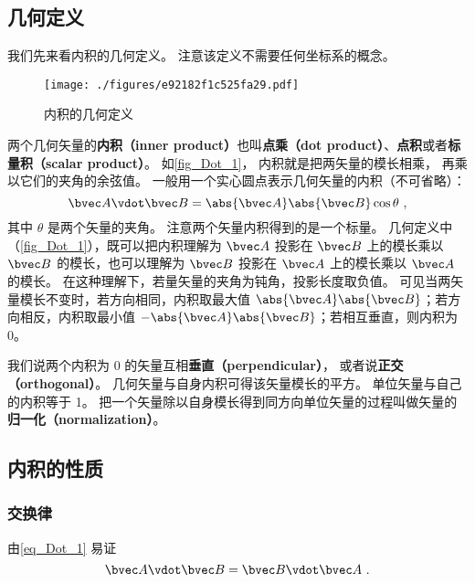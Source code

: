 

\subsection{几何定义}
我们先来看内积的几何定义。 注意该定义不需要任何坐标系的概念。
\begin{figure}[th]
\centering
\texttt{[image: ./figures/e92182f1c525fa29.pdf]}
\caption{内积的几何定义}\label{fig_Dot_1}
\end{figure}

两个几何矢量的\textbf{内积（inner product）}也叫\textbf{点乘（dot product）}、\textbf{点积}或者\textbf{标量积（scalar product）}。 如\autoref{fig_Dot_1}， 内积就是把两矢量的模长相乘， 再乘以它们的夹角的余弦值。 一般用一个实心圆点表示几何矢量的内积（不可省略）：
\begin{equation}\label{eq_Dot_1}
\bvec A \vdot \bvec B = \abs{\bvec A} \abs{\bvec B} \cos\theta ~,
\end{equation}
其中 $\theta$ 是两个矢量的夹角。 注意两个矢量内积得到的是一个标量。 几何定义中（\autoref{fig_Dot_1}），既可以把内积理解为 $\bvec A$ 投影在 $\bvec B$ 上的模长乘以 $\bvec B$ 的模长，也可以理解为 $\bvec B$ 投影在 $\bvec A$ 上的模长乘以 $\bvec A$ 的模长。 在这种理解下，若量矢量的夹角为钝角，投影长度取负值。 可见当两矢量模长不变时，若方向相同，内积取最大值 $\abs{\bvec A}\abs{\bvec B}$；若方向相反，内积取最小值 $-\abs{\bvec A}\abs{\bvec B}$；若相互垂直，则内积为 0。

我们说两个内积为 0 的矢量互相\textbf{垂直（perpendicular）}， 或者说\textbf{正交（orthogonal）}。 几何矢量与自身内积可得该矢量模长的平方。 单位矢量与自己的内积等于 1。 把一个矢量除以自身模长得到同方向单位矢量的过程叫做矢量的\textbf{归一化（normalization）}。

\subsection{内积的性质}

\subsubsection{交换律}
由\autoref{eq_Dot_1} 易证
\begin{equation}\label{eq_Dot_2}
\bvec A \vdot \bvec B = \bvec B \vdot \bvec A~.
\end{equation}


